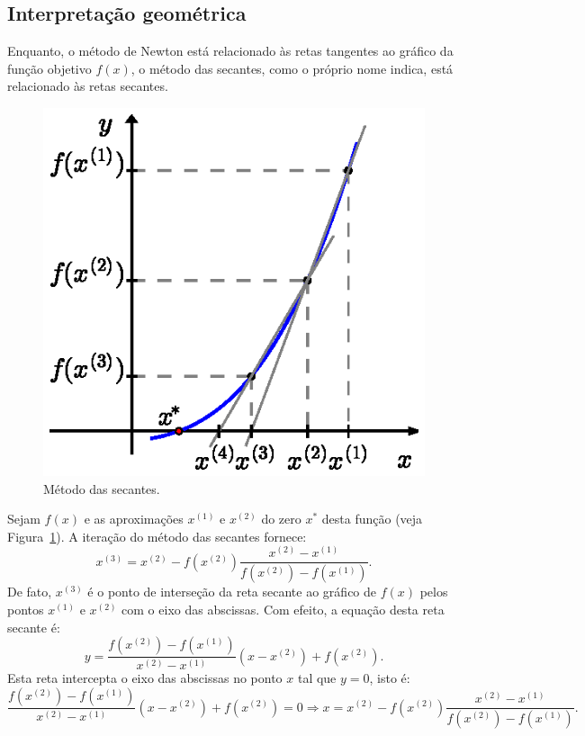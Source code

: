 \begin{ex}
\subsection{Interpretação geométrica}

Enquanto, o método de Newton está relacionado às retas tangentes ao gráfico da função objetivo $f(x)$, o método das secantes, como o próprio nome indica, está relacionado às retas secantes.

\begin{figure}[h]
  \centering
  \includegraphics{./cap_equacao1d/pics/metodo_das_secantes/metodo_das_secantes.eps}
  \caption{Método das secantes.}
  \label{fig:metodo_das_secantes}
\end{figure}

Sejam $f(x)$ e as aproximações $x^{(1)}$ e $x^{(2)}$ do zero $x^*$ desta função (veja Figura~\ref{fig:metodo_das_secantes}). A iteração do método das secantes fornece:
\begin{equation}
  x^{(3)} = x^{(2)} - f(x^{(2)})\frac{x^{(2)} - x^{(1)}}{f(x^{(2)}) - f(x^{(1)})}.
\end{equation}
De fato, $x^{(3)}$ é o ponto de interseção da reta secante ao gráfico de $f(x)$ pelos pontos $x^{(1)}$ e $x^{(2)}$ com o eixo das abscissas. Com efeito, a equação desta reta secante é:
\begin{equation}
  y = \frac{f(x^{(2)}) - f(x^{(1)})}{x^{(2)} - x^{(1)}}(x - x^{(2)}) + f(x^{(2)}).
\end{equation}
Esta reta intercepta o eixo das abscissas no ponto $x$ tal que $y=0$, isto é:
\begin{equation}
  \frac{f(x^{(2)}) - f(x^{(1)})}{x^{(2)} - x^{(1)}}(x - x^{(2)}) + f(x^{(2)}) = 0
  \Rightarrow x = x^{(2)} - f(x^{(2)})\frac{x^{(2)} - x^{(1)}}{f(x^{(2)}) - f(x^{(1)})}.
\end{equation}



\end{ex}
